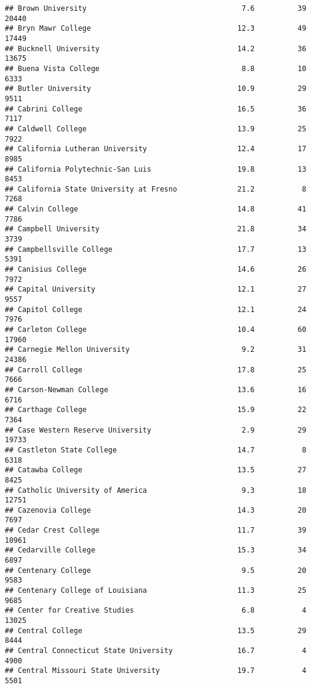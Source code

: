\documentclass[
]{article}
\begin{document}
\begin{verbatim}
## Brown University                                    7.6          39  20440
## Bryn Mawr College                                  12.3          49  17449
## Bucknell University                                14.2          36  13675
## Buena Vista College                                 8.8          10   6333
## Butler University                                  10.9          29   9511
## Cabrini College                                    16.5          36   7117
## Caldwell College                                   13.9          25   7922
## California Lutheran University                     12.4          17   8985
## California Polytechnic-San Luis                    19.8          13   8453
## California State University at Fresno              21.2           8   7268
## Calvin College                                     14.8          41   7786
## Campbell University                                21.8          34   3739
## Campbellsville College                             17.7          13   5391
## Canisius College                                   14.6          26   7972
## Capital University                                 12.1          27   9557
## Capitol College                                    12.1          24   7976
## Carleton College                                   10.4          60  17960
## Carnegie Mellon University                          9.2          31  24386
## Carroll College                                    17.8          25   7666
## Carson-Newman College                              13.6          16   6716
## Carthage College                                   15.9          22   7364
## Case Western Reserve University                     2.9          29  19733
## Castleton State College                            14.7           8   6318
## Catawba College                                    13.5          27   8425
## Catholic University of America                      9.3          18  12751
## Cazenovia College                                  14.3          20   7697
## Cedar Crest College                                11.7          39  10961
## Cedarville College                                 15.3          34   6897
## Centenary College                                   9.5          20   9583
## Centenary College of Louisiana                     11.3          25   9685
## Center for Creative Studies                         6.8           4  13025
## Central College                                    13.5          29   8444
## Central Connecticut State University               16.7           4   4900
## Central Missouri State University                  19.7           4   5501

\end{verbatim}
\end{document}
